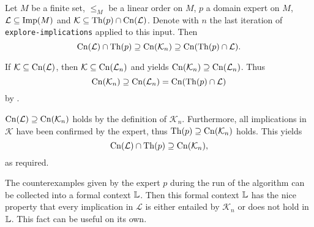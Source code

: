 \begin{Theorem}
  \label{thm:explore-implications-correctness}
  Let $M$ be a finite set, $\leq_{M}$ be a linear order on $M$, $p$ a domain expert on
  $M$, $\mathcal{L} \subseteq \operatorname{Imp}(M)$ and $\mathcal{K} \subseteq \operatorname{Th}(p) \cap
  \operatorname{Cn}(\mathcal{L})$.  Denote with $n$ the last iteration of
  \lstinline{explore-implications} applied to this input.  Then
  \begin{equation*}
    \operatorname{Cn}(\mathcal{L}) \cap \operatorname{Th}(p) \supseteq \operatorname{Cn}(\mathcal{K}_{n}) \supseteq \operatorname{Cn}(\operatorname{Th}(p) \cap \mathcal{L}).
  \end{equation*}
\end{Theorem}
\begin{Proof}
  If $\mathcal{K} \subseteq \operatorname{Cn}(\mathcal{L})$, then $\mathcal{K} \subseteq
  \operatorname{Cn}(\mathcal{L}_{n})$ and  yields
  $\operatorname{Cn}(\mathcal{K}_{n}) \supseteq \operatorname{Cn}(\mathcal{L}_{n})$.  Thus
  \begin{equation*}
    \operatorname{Cn}(\mathcal{K}_{n}) \supseteq \operatorname{Cn}(\mathcal{L}_{n}) = \operatorname{Cn}(\operatorname{Th}(p) \cap \mathcal{L})
  \end{equation*}
  by .

  $\operatorname{Cn}(\mathcal{L}) \supseteq \operatorname{Cn}(\mathcal{K}_{n})$ holds by the definition of
  $\mathcal{K}_{n}$.  Furthermore, all implications in $\mathcal{K}$ have been confirmed
  by the expert, thus $\operatorname{Th}(p) \supseteq \operatorname{Cn}(\mathcal{K}_{n})$ holds.  This yields
  \begin{equation*}
    \operatorname{Cn}(\mathcal{L}) \cap \operatorname{Th}(p) \supseteq \operatorname{Cn}(\mathcal{K}_{n}),
  \end{equation*}
  as required.
\end{Proof}

The counterexamples given by the expert $p$ during the run of the algorithm can be
collected into a formal context ${\mathbb{L}}$.  Then this formal context ${\mathbb{L}}$ has the nice
property that every implication in $\mathcal{L}$ is either entailed by $\mathcal{K}_{n}$
or does not hold in ${\mathbb{L}}$.  This fact can be useful on its own.

